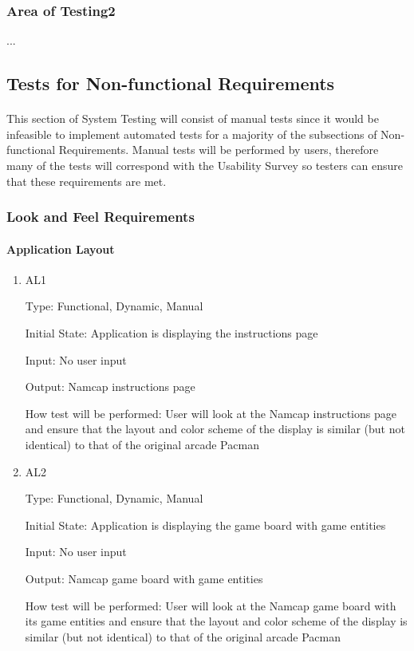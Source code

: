 \documentclass[12pt, titlepage]{article}
\begin{document}
\subsubsection{Area of Testing2}

...

\subsection{Tests for Non-functional Requirements}

\paragraph{}
This section of System Testing will consist of manual tests since it would be infeasible to implement automated tests for a majority of the subsections of Non-functional Requirements. Manual tests will be performed by users, therefore many of the tests will correspond with the Usability Survey so testers can ensure that these requirements are met.

\subsubsection{Look and Feel Requirements}
		
\paragraph{Application Layout}

\begin{enumerate}

\item{AL1\\}

Type: Functional, Dynamic, Manual
					
Initial State: Application is displaying the instructions page
					
Input: No user input
					
Output: Namcap instructions page
					
How test will be performed: User will look at the Namcap instructions page and ensure that the layout and color scheme of the display is similar (but not identical) to that of the original arcade Pacman
					
\item{AL2\\}

Type: Functional, Dynamic, Manual
					
Initial State: Application is displaying the game board with game entities
					
Input: No user input
					
Output: Namcap game board with game entities
					
How test will be performed: User will look at the Namcap game board with its game entities and ensure that the layout and color scheme of the display is similar (but not identical) to that of the original arcade Pacman

\end{enumerate}
\end{document}
